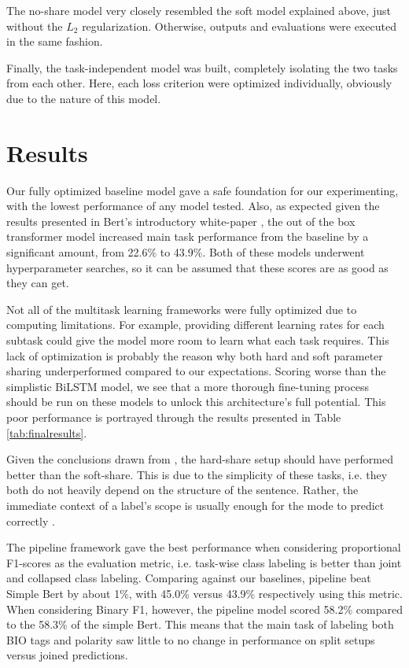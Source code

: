 \documentclass[11pt,a4paper]{article}
\begin{document}
The no-share model very closely resembled the soft model explained above, just without the $L_2$ regularization. Otherwise, outputs and evaluations were executed in the same fashion. 

Finally, the task-independent model was built, completely isolating the two tasks from each other. Here, each loss criterion were optimized individually, obviously due to the nature of this model. 


\section{Results}
\label{results}
Our fully optimized baseline model gave a safe foundation for our experimenting, with the lowest performance of any model tested. Also, as expected given the results presented in Bert's introductory white-paper \cite{devlin-etal-2019-bert}, the out of the box transformer model increased main task performance from the baseline by a significant amount, from 22.6\% to 43.9\%. Both of these models underwent hyperparameter searches, so it can be assumed that these scores are as good as they can get. 

Not all of the multitask learning frameworks were fully optimized due to computing limitations. For example, providing different learning rates for each subtask could give the model more room to learn what each task requires. This lack of optimization is probably the reason why both hard and soft parameter sharing underperformed compared to our expectations. Scoring worse than the simplistic BiLSTM model, we see that a more thorough fine-tuning process should be run on these models to unlock this architecture's full potential. This poor performance is portrayed through the results presented in Table \ref{tab:finalresults}.

Given the conclusions drawn from \citealt{MTLNEG}, the hard-share setup should have performed better than the soft-share. This is due to the simplicity of these tasks, i.e. they both do not heavily depend on the structure of the sentence. Rather, the immediate context of a label's scope is usually enough for the mode to predict correctly \cite{sanh2018hierarchical}. 

The pipeline framework gave the best performance when considering proportional F1-scores as the evaluation metric, i.e. task-wise class labeling is better than joint and collapsed class labeling. Comparing against our baselines, pipeline beat Simple Bert by about 1\%, with 45.0\% versus 43.9\% respectively using this metric.
When considering Binary F1, however, the pipeline model scored 58.2\% compared to the 58.3\% of the simple Bert. This means that the main task of labeling both BIO tags and polarity saw little to no change in performance on split setups versus joined predictions.
\end{document}
